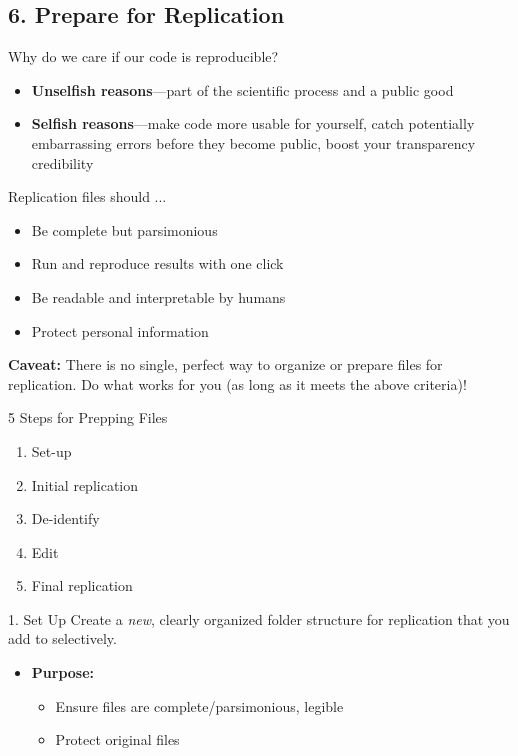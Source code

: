 \documentclass[12pt, compress, handout]{beamer}
\let\noteitem\item %
\renewcommand{\item}{ 
	\noteitem\vspace{\fill}
	}
\begin{document}
	
\subsection{6. Prepare for Replication}

	\begin{frame}{Why do we care if our code is reproducible?}
		\begin{itemize}
			\item \textbf{Unselfish reasons}---part of the scientific process and a public good
			\item \textbf{Selfish reasons}---make code more usable for yourself, catch potentially embarrassing errors before they become public, boost your transparency credibility
		\end{itemize}
		
	\end{frame}

	\begin{frame}{Replication files should ...}
	
		\begin{itemize}
			\item Be complete but parsimonious
			\item Run and reproduce results with one click
			\item Be readable and interpretable by humans
			\item Protect personal information
		\end{itemize}
		
		\bigskip
		\pause
		\textbf{Caveat:} There is no single, perfect way to organize or prepare files for replication. Do what works for you (as long as it meets the above criteria)!
	\end{frame}

	\begin{frame}{5 Steps for Prepping Files}
			\begin{enumerate}
				\item Set-up
				\item Initial replication
				\item De-identify
				\item Edit
				\item Final replication
			\end{enumerate}
	\end{frame}
	  
		 \begin{frame}{1. Set Up}
		 	Create a \textit{new}, clearly organized folder structure for replication that you add to selectively.
		 	
		 	\pause
		 	\begin{itemize}
		 		\item \textbf{Purpose:} 
		 		\begin{itemize}
		 			\item Ensure files are \textcolor{burntorange}{complete/parsimonious, legible}
		 			\item Protect original files
		 		\end{itemize}
		 	\end{itemize}
		 	
		 \end{frame}
		  
\end{document}
